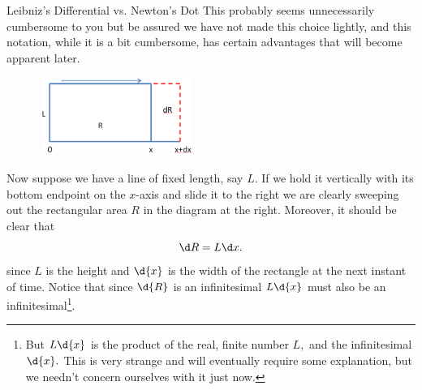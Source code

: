 \begin{mynotation}{Leibniz's Differential vs. Newton's Dot}
This probably seems unnecessarily cumbersome to you but be assured we
have not made this choice lightly, and this notation, while it is a
bit cumbersome, has certain advantages that will become apparent
later.
\end{mynotation}


\begin{figure}
\captionsetup{labelformat=empty}
\centerline{\includegraphics*[height=1in,width=2in]{Figures/DifferentialRect}}
\label{fig:DifferentialRect}
\end{figure}
Now suppose we have a line of fixed length, say $L.$ If we hold it
vertically with its bottom endpoint on the $x$-axis and slide it to
the right we are clearly sweeping out the rectangular area $R$ in the
 diagram at the right. Moreover, it should be clear that 
\begin{equation}
  \label{eq:DifferentialOfRectangle}
  \d R = L\d x.
\end{equation}
since $L$ is the height and $\d{x}$ is the width of the rectangle at
the next instant of time. Notice that since $\d{R}$ is an infinitesimal
$L\d{x}$ must also be an infinitesimal\footnote{But $L\d{x}$ is the
  product of the real, finite number $L,$ and the infinitesimal
  $\d{x}.$ This is very strange and will eventually require some
  explanation, but we needn't concern ourselves with it just now. }.




